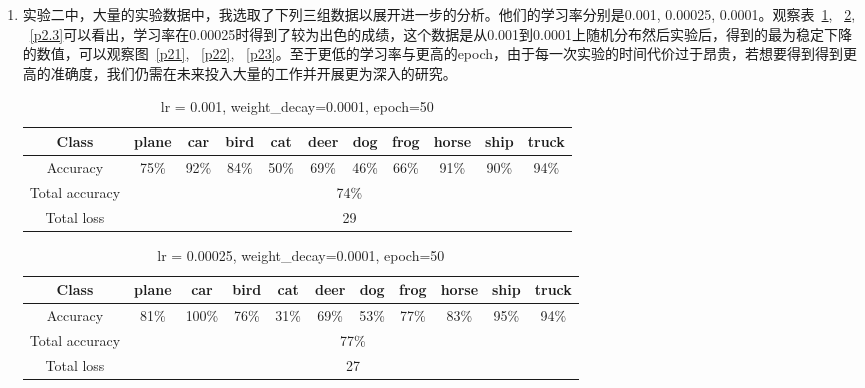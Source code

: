 \documentclass[a4paper,UTF8]{article}
\numberwithin{equation}{section}
\begin{document}
\begin{enumerate}[(1)]
	\pagebreak
	\item 实验二中，大量的实验数据中，我选取了下列三组数据以展开进一步的分析。他们的学习率分别是0.001, 0.00025, 0.0001。观察表~\ref{p2.1}, ~\ref{p2.2}, ~\ref{p2.3}可以看出，学习率在0.00025时得到了较为出色的成绩，这个数据是从0.001到0.0001上随机分布然后实验后，得到的最为稳定下降的数值，可以观察图~\ref{p21}, ~\ref{p22}, ~\ref{p23}。至于更低的学习率与更高的epoch，由于每一次实验的时间代价过于昂贵，若想要得到得到更高的准确度，我们仍需在未来投入大量的工作并开展更为深入的研究。
	
	\begin{table}[!h]
		\centering
		\caption{lr = 0.001, weight\_decay=0.0001, epoch=50}
		\label{p2.1}
		\begin{tabular}{|c|c|c|c|c|c|c|c|c|c|c|}
			\hline
			Class          & plane & car  & bird & cat  & deer & dog  & frog & horse & ship & truck \\ \hline
			Accuracy       & 75\%  & 92\% & 84\% & 50\% & 69\% & 46\% & 66\% & 91\%  & 90\% & 94\%  \\ \hline
			Total accuracy & \multicolumn{10}{c|}{74\%}                                             \\ \hline
			Total loss 	   & \multicolumn{10}{c|}{29}                                             \\ \hline
		\end{tabular}
	\end{table}
	


	\begin{table}[!h]
	\centering
	\caption{lr = 0.00025, weight\_decay=0.0001, epoch=50}
	\label{p2.2}
	\begin{tabular}{|c|c|c|c|c|c|c|c|c|c|c|}
		\hline
		Class          & plane & car  & bird & cat  & deer & dog  & frog & horse & ship & truck \\ \hline
		Accuracy       & 81\%  & 100\% & 76\% & 31\% & 69\% & 53\% & 77\% & 83\%  & 95\% & 94\%  \\ \hline
		Total accuracy & \multicolumn{10}{c|}{77\%}                                             \\ \hline
		Total loss 	   & \multicolumn{10}{c|}{27}                                             \\ \hline
	\end{tabular}
	\end{table}


\end{enumerate}
\end{document}
